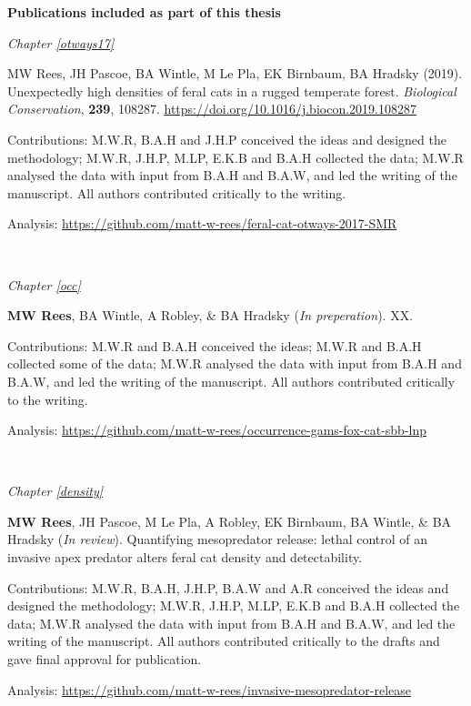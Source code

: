 \documentclass[11pt,a4paper,titlepage,twoside,openright]{style/unimelbthesis}
\begin{document}
\begin{frontmatter}
\begin{preface}
    \textbf{Publications included as part of this thesis}
    
    \emph{Chapter \ref{otways17}}
    
    MW Rees, JH Pascoe, BA Wintle, M Le Pla, EK Birnbaum, BA Hradsky (2019). Unexpectedly high densities of feral cats in a rugged temperate forest. \emph{Biological Conservation}, \textbf{239}, 108287. \url{https://doi.org/10.1016/j.biocon.2019.108287}
    
    Contributions: M.W.R, B.A.H and J.H.P conceived the ideas and designed the methodology; M.W.R, J.H.P, M.LP, E.K.B and B.A.H collected the data; M.W.R analysed the data with input from B.A.H and B.A.W, and led the writing of the manuscript. All authors contributed critically to the writing.
    
    Analysis: \url{https://github.com/matt-w-rees/feral-cat-otways-2017-SMR}
    
    \(~\)
    
    \emph{Chapter \ref{occ}}
    
    \textbf{MW Rees}, BA Wintle, A Robley, \& BA Hradsky (\emph{In preperation}). XX.
    
    Contributions: M.W.R and B.A.H conceived the ideas; M.W.R and B.A.H collected some of the data; M.W.R analysed the data with input from B.A.H and B.A.W, and led the writing of the manuscript. All authors contributed critically to the writing.
    
    Analysis: \url{https://github.com/matt-w-rees/occurrence-gams-fox-cat-sbb-lnp}
    
    \(~\)
    
    \emph{Chapter \ref{density}}
    
    \textbf{MW Rees}, JH Pascoe, M Le Pla, A Robley, EK Birnbaum, BA Wintle, \& BA Hradsky (\emph{In review}). Quantifying mesopredator release: lethal control of an invasive apex predator alters feral cat density and detectability.
    
    Contributions: M.W.R, B.A.H, J.H.P, B.A.W and A.R conceived the ideas and designed the methodology; M.W.R, J.H.P, M.LP, E.K.B and B.A.H collected the data; M.W.R analysed the data with input from B.A.H and B.A.W, and led the writing of the manuscript. All authors contributed critically to the drafts and gave final approval for publication.
    
    Analysis: \url{https://github.com/matt-w-rees/invasive-mesopredator-release}
    
    \(~\)
    

\end{preface}
\end{frontmatter}
\end{document}
